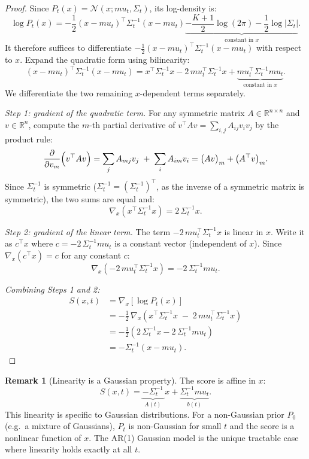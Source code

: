 \documentclass[12pt, a4paper]{article}
\def\bx{x}%
\def\bmu{mu}%
\def\bm#1{#1}%
\theoremstyle{definition}
\newtheorem{remark}{Remark}[section]
\newcommand{\R}{\mathbb{R}}
\newcommand{\N}{\mathcal{N}}
\newcommand{\bx}{\bm{x}}
\newcommand{\bmu}{\bm{\mu}}
\begin{document}
\begin{proof}
Since $P_t(\bx) = \N(\bx;\bmu_t,\Sigma_t)$, its log-density is:
\[
  \log P_t(\bx)
  = -\frac{1}{2}(\bx-\bmu_t)^\top\Sigma_t^{-1}(\bx-\bmu_t)
    \underbrace{- \frac{K+1}{2}\log(2\pi) - \frac{1}{2}\log|\Sigma_t|}_{\text{constant in }\bx}.
\]
It therefore suffices to differentiate $-\frac{1}{2}(\bx-\bmu_t)^\top\Sigma_t^{-1}(\bx-\bmu_t)$
with respect to $\bx$. Expand the quadratic form using bilinearity:
\[
  (\bx-\bmu_t)^\top\Sigma_t^{-1}(\bx-\bmu_t)
  = \bx^\top\Sigma_t^{-1}\bx
    - 2\,\bmu_t^\top\Sigma_t^{-1}\bx
    + \underbrace{\bmu_t^\top\Sigma_t^{-1}\bmu_t}_{\text{constant in }\bx}.
\]
We differentiate the two remaining $\bx$-dependent terms separately.

\medskip
\noindent\textit{Step 1: gradient of the quadratic term.}
For any symmetric matrix $A \in \R^{n\times n}$ and $\bm{v}\in\R^n$,
compute the $m$-th partial derivative of $\bm{v}^\top A\bm{v}
= \sum_{i,j}A_{ij}v_iv_j$ by the product rule:
\[
  \frac{\partial}{\partial v_m}\Bigl(\bm{v}^\top A\bm{v}\Bigr)
  = \sum_j A_{mj}v_j \;+\; \sum_i A_{im}v_i
  = \bigl(A\bm{v}\bigr)_m + \bigl(A^\top\bm{v}\bigr)_m.
\]
Since $\Sigma_t^{-1}$ is symmetric ($\Sigma_t^{-1} = (\Sigma_t^{-1})^\top$,
as the inverse of a symmetric matrix is symmetric), the two sums are
equal and:
\[
  \nabla_{\bx}\!\left(\bx^\top\Sigma_t^{-1}\bx\right)
  = 2\,\Sigma_t^{-1}\bx.
\]

\medskip
\noindent\textit{Step 2: gradient of the linear term.}
The term $-2\,\bmu_t^\top\Sigma_t^{-1}\bx$ is linear in $\bx$.
Write it as $\bm{c}^\top\bx$ where $\bm{c} = -2\,\Sigma_t^{-1}\bmu_t$
is a constant vector (independent of $\bx$). Since
$\nabla_{\bx}(\bm{c}^\top\bx) = \bm{c}$ for any constant $\bm{c}$:
\[
  \nabla_{\bx}\!\left(-2\,\bmu_t^\top\Sigma_t^{-1}\bx\right)
  = -2\,\Sigma_t^{-1}\bmu_t.
\]

\medskip
\noindent\textit{Combining Steps 1 and 2:}
\begin{align*}
  \bm{S}(\bx,t)
  &= \nabla_{\bx}\!\left[\log P_t(\bx)\right] \\
  &= -\frac{1}{2}\,\nabla_{\bx}\!\left(
      \bx^{\top}\Sigma_t^{-1}\bx \;-\; 2\,\bmu_t^{\top}\Sigma_t^{-1}\bx
    \right) \\
  &= -\frac{1}{2}\!\left(2\,\Sigma_t^{-1}\bx - 2\,\Sigma_t^{-1}\bmu_t\right) \\
  &= -\Sigma_t^{-1}(\bx - \bmu_t).
\end{align*}
\end{proof}

\begin{remark}[Linearity is a Gaussian property]
The score is affine in $\bx$:
\[
  \bm{S}(\bx, t) = \underbrace{-\Sigma_t^{-1}}_{A(t)}\,\bx
  + \underbrace{\Sigma_t^{-1}\bmu_t}_{\bm{b}(t)}.
\]
This linearity is specific to Gaussian distributions. For a non-Gaussian
prior $P_0$ (e.g.\ a mixture of Gaussians), $P_t$ is non-Gaussian for
small $t$ and the score is a nonlinear function of $\bx$. The AR(1)
Gaussian model is the unique tractable case where linearity holds exactly
at all $t$.
\end{remark}
\end{document}
